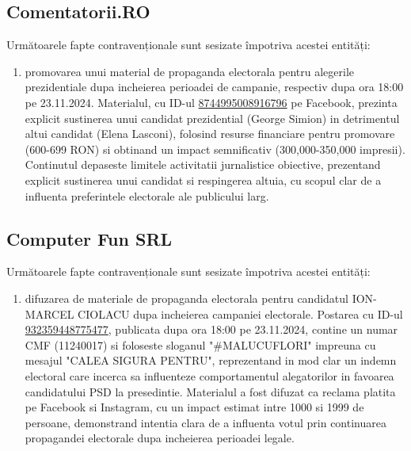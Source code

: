 \documentclass[a4paper,12pt]{article}
\begin{document}
\vspace{0.5cm}

\subsection{Comentatorii.RO}
Următoarele fapte contravenționale sunt sesizate împotriva acestei entități:

\begin{enumerate}[leftmargin=*, label=\arabic*.)]
    \item promovarea unui material de propaganda electorala pentru alegerile prezidentiale dupa incheierea perioadei de campanie, respectiv dupa ora 18:00 pe 23.11.2024. Materialul, cu ID-ul \href{https://www.facebook.com/ads/library/?id=8744995008916796}{8744995008916796} pe Facebook, prezinta explicit sustinerea unui candidat prezidential (George Simion) in detrimentul altui candidat (Elena Lasconi), folosind resurse financiare pentru promovare (600-699 RON) si obtinand un impact semnificativ (300,000-350,000 impresii). Continutul depaseste limitele activitatii jurnalistice obiective, prezentand explicit sustinerea unui candidat si respingerea altuia, cu scopul clar de a influenta preferintele electorale ale publicului larg.
\end{enumerate}

\vspace{0.5cm}

\subsection{Computer Fun SRL}
Următoarele fapte contravenționale sunt sesizate împotriva acestei entități:

\begin{enumerate}[leftmargin=*, label=\arabic*.)]
    \item difuzarea de materiale de propaganda electorala pentru candidatul ION-MARCEL CIOLACU dupa incheierea campaniei electorale. Postarea cu ID-ul \href{https://www.facebook.com/ads/library/?id=932359448775477}{932359448775477}, publicata dupa ora 18:00 pe 23.11.2024, contine un numar CMF (11240017) si foloseste sloganul "\#MALUCUFLORI" impreuna cu mesajul "CALEA SIGURA PENTRU", reprezentand in mod clar un indemn electoral care incerca sa influenteze comportamentul alegatorilor in favoarea candidatului PSD la presedintie. Materialul a fost difuzat ca reclama platita pe Facebook si Instagram, cu un impact estimat intre 1000 si 1999 de persoane, demonstrand intentia clara de a influenta votul prin continuarea propagandei electorale dupa incheierea perioadei legale.
\end{enumerate}
\end{document}
